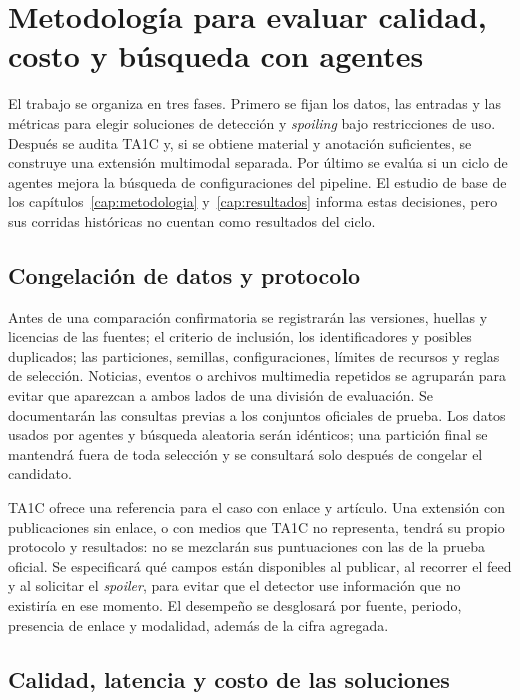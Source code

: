 \chapter[Metodología propuesta]{Metodología para evaluar calidad, costo y búsqueda con agentes}
\label{cap:evaluacion-marco}

El trabajo se organiza en tres fases. Primero se fijan los datos, las entradas y las métricas para elegir soluciones de detección y \emph{spoiling} bajo restricciones de uso. Después se audita TA1C y, si se obtiene material y anotación suficientes, se construye una extensión multimodal separada. Por último se evalúa si un ciclo de agentes mejora la búsqueda de configuraciones del pipeline. El estudio de base de los capítulos~\ref{cap:metodologia} y~\ref{cap:resultados} informa estas decisiones, pero sus corridas históricas no cuentan como resultados del ciclo.

\section{Congelación de datos y protocolo}

Antes de una comparación confirmatoria se registrarán las versiones, huellas y licencias de las fuentes; el criterio de inclusión, los identificadores y posibles duplicados; las particiones, semillas, configuraciones, límites de recursos y reglas de selección. Noticias, eventos o archivos multimedia repetidos se agruparán para evitar que aparezcan a ambos lados de una división de evaluación. Se documentarán las consultas previas a los conjuntos oficiales de prueba. Los datos usados por agentes y búsqueda aleatoria serán idénticos; una partición final se mantendrá fuera de toda selección y se consultará solo después de congelar el candidato.

TA1C ofrece una referencia para el caso con enlace y artículo. Una extensión con publicaciones sin enlace, o con medios que TA1C no representa, tendrá su propio protocolo y resultados: no se mezclarán sus puntuaciones con las de la prueba oficial. Se especificará qué campos están disponibles al publicar, al recorrer el feed y al solicitar el \emph{spoiler}, para evitar que el detector use información que no existiría en ese momento. El desempeño se desglosará por fuente, periodo, presencia de enlace y modalidad, además de la cifra agregada.

\section{Calidad, latencia y costo de las soluciones}

